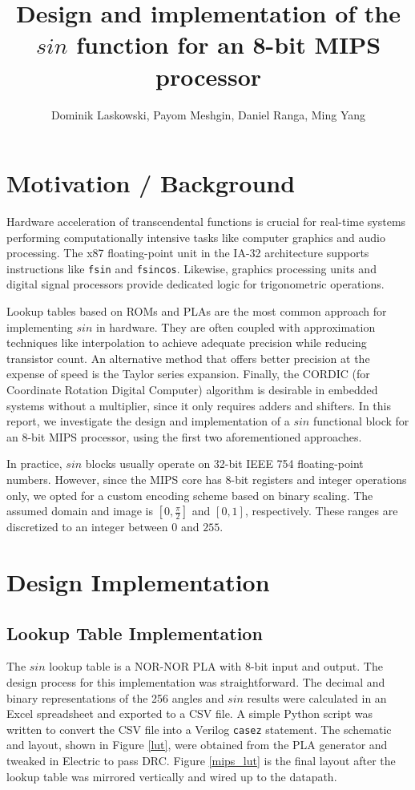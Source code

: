 \documentclass[10pt,journal]{IEEEtran}
\title{Design and implementation of the $sin$ function for an 8-bit MIPS processor}
\author{Dominik Laskowski, Payom Meshgin, Daniel Ranga, Ming Yang}
\begin{document}
\maketitle

\section{Motivation / Background}
Hardware acceleration of transcendental functions is crucial for real-time systems
performing computationally intensive tasks like computer graphics and audio processing.
The x87 floating-point unit in the IA-32 architecture supports instructions like \texttt{fsin}
and \texttt{fsincos}. Likewise, graphics processing units and digital signal processors
provide dedicated logic for trigonometric operations.

Lookup tables based on ROMs and PLAs are the most common approach for implementing $sin$
in hardware. They are often coupled with approximation techniques like interpolation to
achieve adequate precision while reducing transistor count. An alternative method that
offers better precision at the expense of speed is the Taylor series expansion. Finally,
the CORDIC (for Coordinate Rotation Digital Computer) algorithm is desirable in embedded
systems without a multiplier, since it only requires adders and shifters.
In this report, we investigate the design and implementation of a $sin$ functional block for
an 8-bit MIPS processor, using the first two aforementioned approaches.

In practice, $sin$ blocks usually operate on 32-bit IEEE 754 floating-point numbers. However,
since the MIPS core has 8-bit registers and integer operations only, we opted for a custom encoding
scheme based on binary scaling. The assumed domain and image is $[0, \frac{\pi}{2}]$ and $[0, 1]$,
respectively. These ranges are discretized to an integer between $0$ and $255$.

\section{Design Implementation}
\subsection{Lookup Table Implementation}
The $sin$ lookup table is a NOR-NOR PLA with 8-bit input and output. The design process for this
implementation was straightforward. The decimal and binary representations of the 256 angles and
$sin$ results were calculated in an Excel spreadsheet and exported to a CSV file. A simple Python
script was written to convert the CSV file into a Verilog \texttt{casez} statement. The schematic
and layout, shown in Figure \ref{lut}, were obtained from the PLA generator and tweaked in Electric
to pass DRC. Figure \ref{mips_lut} is the final layout after the lookup table was mirrored vertically
and wired up to the datapath.
\end{document}
